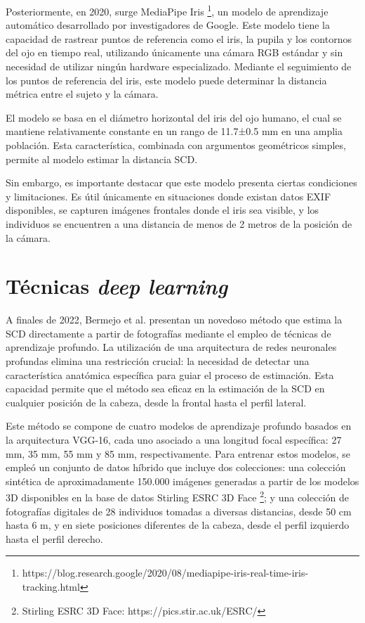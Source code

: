 Posteriormente, en 2020, surge MediaPipe Iris \footnote{https://blog.research.google/2020/08/mediapipe-iris-real-time-iris-tracking.html}, un modelo de aprendizaje automático desarrollado por investigadores de Google. Este modelo tiene la capacidad de rastrear puntos de referencia como el iris, la pupila y los contornos del ojo en tiempo real, utilizando únicamente una cámara RGB estándar y sin necesidad de utilizar ningún hardware especializado. Mediante el seguimiento de los puntos de referencia del iris, este modelo puede determinar la distancia métrica entre el sujeto y la cámara.

El modelo se basa en el diámetro horizontal del iris del ojo humano, el cual se mantiene relativamente constante en un rango de 11.7±0.5 mm en una amplia población. Esta característica, combinada con argumentos geométricos simples, permite al modelo estimar la distancia SCD.

Sin embargo, es importante destacar que este modelo presenta ciertas condiciones y limitaciones. Es útil únicamente en situaciones donde existan datos EXIF disponibles, se capturen imágenes frontales donde el iris sea visible, y los individuos se encuentren a una distancia de menos de 2 metros de la posición de la cámara.

\section{Técnicas \textit{deep learning}}

A finales de 2022, Bermejo et al. \cite{14} presentan un novedoso método que estima la SCD directamente a partir de fotografías mediante el empleo de técnicas de aprendizaje profundo. La utilización de una arquitectura de redes neuronales profundas elimina una restricción crucial: la necesidad de detectar una característica anatómica específica para guiar el proceso de estimación. Esta capacidad permite que el método sea eficaz en la estimación de la SCD en cualquier posición de la cabeza, desde la frontal hasta el perfil lateral.

Este método se compone de cuatro modelos de aprendizaje profundo basados en la arquitectura VGG-16, cada uno asociado a una longitud focal específica: 27 mm, 35 mm, 55 mm y 85 mm, respectivamente. Para entrenar estos modelos, se empleó un conjunto de datos híbrido que incluye dos colecciones: una colección sintética de aproximadamente 150.000 imágenes generadas a partir de los modelos 3D disponibles en la base de datos Stirling ESRC 3D Face \footnote{Stirling ESRC 3D Face: https://pics.stir.ac.uk/ESRC/}; y una colección de fotografías digitales de 28 individuos tomadas a diversas distancias, desde 50 cm hasta 6 m, y en siete posiciones diferentes de la cabeza, desde el perfil izquierdo hasta el perfil derecho.

